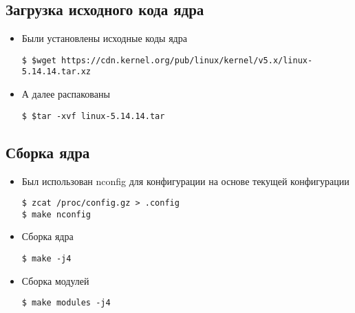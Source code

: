 \documentclass[a4paper]{article}
\begin{document}
    \subsection{Загрузка исходного кода ядра}
    \begin{itemize}
        \item Были установлены исходные коды ядра
        \begin{verbatim}
$ $wget https://cdn.kernel.org/pub/linux/kernel/v5.x/linux-5.14.14.tar.xz
        \end{verbatim}
        \item А далее распакованы
        \begin{verbatim}
$ $tar -xvf linux-5.14.14.tar
        \end{verbatim}
    \end{itemize}

    \subsection{Сборка ядра}
    \begin{itemize}
        \item Был использован nconfig для конфигурации на основе текущей конфигурации
        \begin{verbatim}
$ zcat /proc/config.gz > .config
$ make nconfig
        \end{verbatim}
        \item Сборка ядра
        \begin{verbatim}
$ make -j4
        \end{verbatim}
        \item Сборка модулей
        \begin{verbatim}
$ make modules -j4
        \end{verbatim}
    \end{itemize}
\end{document}
